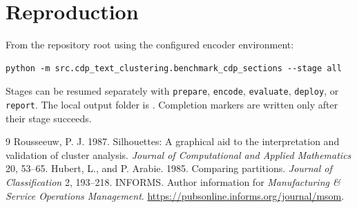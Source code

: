 \documentclass[12pt]{article}
\begin{document}
\section*{Reproduction}
From the repository root using the configured encoder environment:
\begin{verbatim}
python -m src.cdp_text_clustering.benchmark_cdp_sections --stage all
\end{verbatim}
Stages can be resumed separately with \texttt{prepare}, \texttt{encode},
\texttt{evaluate}, \texttt{deploy}, or \texttt{report}. The local output folder is
.
Completion markers are written only after their stage succeeds.

\begin{thebibliography}{9}
 Rousseeuw, P. J. 1987. Silhouettes: A graphical aid to the
interpretation and validation of cluster analysis. \emph{Journal of Computational
and Applied Mathematics} 20, 53--65.
 Hubert, L., and P. Arabie. 1985. Comparing partitions.
\emph{Journal of Classification} 2, 193--218.
 INFORMS. Author information for \emph{Manufacturing \& Service
Operations Management}. \url{https://pubsonline.informs.org/journal/msom}.
\end{thebibliography}
\end{document}
